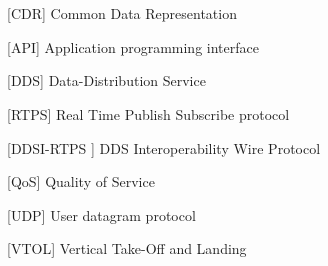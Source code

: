 \cleardoublepage
\chapter*{\listofabbrevname}
{}

\begin{acronym}[KolikMista]

		[CDR]
		{Common Data Representation}
		
		[API]
		{Application programming interface}

		[DDS\textsuperscript \textregistered ]
		{Data-Distribution Service\textsuperscript \textregistered}
		
		[RTPS]
		{Real Time Publish Subscribe protocol}
		
	    [DDSI-RTPS\textsuperscript{\texttrademark} ]
	    {DDS Interoperability Wire Protocol\textsuperscript{\texttrademark}}
		
		[QoS]
		{Quality of Service}
		
		[UDP]
		{User datagram protocol}
		
		[VTOL]
		{Vertical Take-Off and Landing}
		
\end{acronym}
